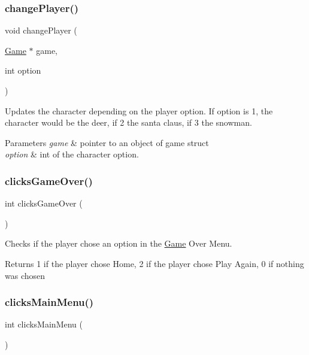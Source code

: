 \subsubsection{\texorpdfstring{change\+Player()}{changePlayer()}}
{\footnotesize\ttfamily void change\+Player (\begin{DoxyParamCaption}\item[{\hyperlink{struct_game}{Game} $\ast$}]{game,  }\item[{int}]{option }\end{DoxyParamCaption})}



Updates the character depending on the player option. If option is 1, the character would be the deer, if 2 the santa claus, if 3 the snowman. 


\begin{DoxyParams}{Parameters}
{\em game} & pointer to an object of game struct \\
\hline
{\em option} & int of the character option. \\
\hline
\end{DoxyParams}
\mbox{\label{group___graphics_ga7b226a076e2fce195972329b07d54956}} 
\subsubsection{\texorpdfstring{clicks\+Game\+Over()}{clicksGameOver()}}
{\footnotesize\ttfamily int clicks\+Game\+Over (\begin{DoxyParamCaption}{ }\end{DoxyParamCaption})}



Checks if the player chose an option in the \hyperlink{struct_game}{Game} Over Menu. 

\begin{DoxyReturn}{Returns}
1 if the player chose Home, 2 if the player chose Play Again, 0 if nothing was chosen 
\end{DoxyReturn}
\mbox{\label{group___graphics_gad474a474d64464f56c893125ae05fe15}} 
\subsubsection{\texorpdfstring{clicks\+Main\+Menu()}{clicksMainMenu()}}
{\footnotesize\ttfamily int clicks\+Main\+Menu (\begin{DoxyParamCaption}{ }\end{DoxyParamCaption})}



